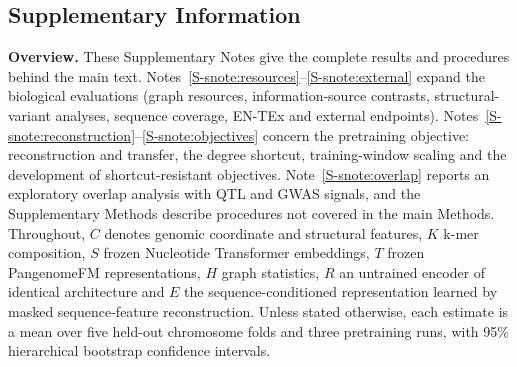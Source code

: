 \documentclass[11pt]{article}
\newcommand{\method}{PangenomeFM\xspace}
\begin{document}
\clearpage
\setcounter{section}{0}
\setcounter{table}{0}
\setcounter{figure}{0}
\setcounter{secnumdepth}{1}
\renewcommand{\theHsection}{supp.\arabic{section}}
\renewcommand{\theHtable}{supp.\arabic{table}}
\renewcommand{\theHfigure}{supp.\arabic{figure}}
\captionsetup[figure]{name=Supplementary Fig.}
\captionsetup[table]{name=Supplementary Table}
\begin{bibunit}[unsrtnat]
\renewcommand{\citenumfont}[1]{S#1}
\renewcommand{\bibnumfmt}[1]{[S#1]}



\section*{Supplementary Information}\label{S-sec:supplement}
\vspace{4pt}

\noindent\textbf{Overview.} These Supplementary Notes give the complete results and procedures behind the main text. Notes~\ref{S-snote:resources}--\ref{S-snote:external} expand the biological evaluations (graph resources, information-source contrasts, structural-variant analyses, sequence coverage, EN-TEx and external endpoints). Notes~\ref{S-snote:reconstruction}--\ref{S-snote:objectives} concern the pretraining objective: reconstruction and transfer, the degree shortcut, training-window scaling and the development of shortcut-resistant objectives. Note~\ref{S-snote:overlap} reports an exploratory overlap analysis with QTL and GWAS signals, and the Supplementary Methods describe procedures not covered in the main Methods. Throughout, $C$ denotes genomic coordinate and structural features, $K$ k-mer composition, $S$ frozen Nucleotide Transformer embeddings\cite{supp__dalla2025nucleotide}, $T$ frozen \method representations, $H$ graph statistics, $R$ an untrained encoder of identical architecture and $E$ the sequence-conditioned representation learned by masked sequence-feature reconstruction. Unless stated otherwise, each estimate is a mean over five held-out chromosome folds and three pretraining runs, with 95\% hierarchical bootstrap confidence intervals.




\end{bibunit}
\end{document}
